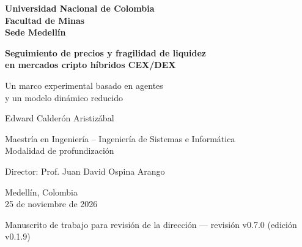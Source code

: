 \documentclass[11pt,letterpaper]{report}
\newcommand{\versionTesis}{v0.1.9}
\newcommand{\revisionManuscrito}{v0.7.0}
\numberwithin{equation}{chapter}
\begin{document}
\begin{titlepage}
  \thispagestyle{empty}
  \centering
  \singlespacing
  {\large\bfseries Universidad Nacional de Colombia\\[2pt]
  Facultad de Minas\\[2pt]
  Sede Medellín\par}
  \vspace{3.2cm}
  {\LARGE\bfseries Seguimiento de precios y fragilidad de liquidez\\
  en mercados cripto híbridos CEX/DEX\par}
  \vspace{0.9cm}
  {\Large Un marco experimental basado en agentes\\
  y un modelo dinámico reducido\par}
  \vspace{2.6cm}
  {\Large Edward Calderón Aristizábal\par}
  \vspace{1.6cm}
  {\large Maestría en Ingeniería -- Ingeniería de Sistemas e Informática\\[2pt]
  Modalidad de profundización\par}
  \vspace{0.8cm}
  {\large Director: Prof. Juan David Ospina Arango\par}
  \vfill
  {\large Medellín, Colombia\\[2pt]
  25 de noviembre de 2026\par}
  \vspace{0.3cm}
  {\small Manuscrito de trabajo para revisión de la dirección --- revisión \revisionManuscrito{} (edición \versionTesis{})\par}
\end{titlepage}

\setcounter{page}{1}

\begingroup
\setcounter{secnumdepth}{-1}
\titleformat{\section}{\Large\bfseries}{}{0pt}{}
\singlespacing

\clearpage

\endgroup
\setcounter{secnumdepth}{2}
\end{document}
